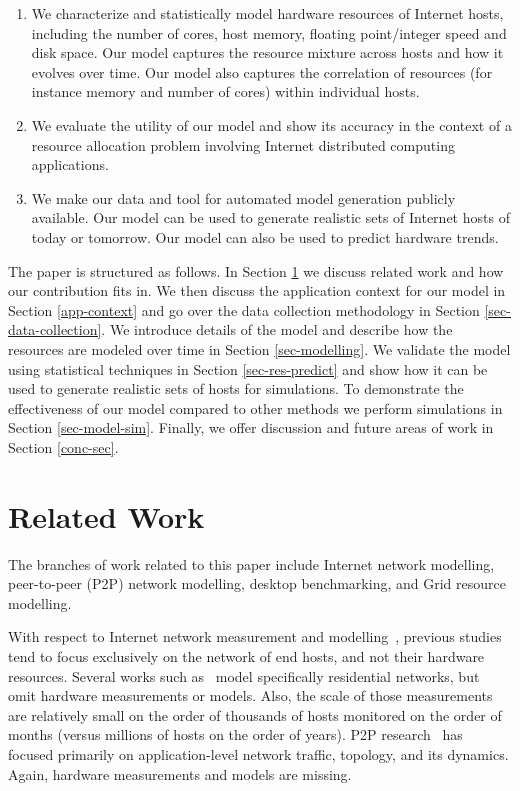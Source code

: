 \documentclass[conference]{IEEEtran}
\begin{document}
\begin{enumerate}
\item We characterize and statistically model hardware
  resources of Internet hosts, including the number of
  cores, host memory, floating point/integer speed and disk
  space.  Our model captures the resource mixture across
  hosts and how it evolves over time.  Our model
  also captures the correlation of resources (for instance
  memory and number of cores) within individual hosts.

\item We evaluate the utility of our model and show its
  accuracy in the context of a resource allocation problem
  involving Internet distributed computing applications.


\item We make our data and tool for automated model
  generation publicly available.  Our model can be used to
  generate realistic sets of Internet hosts of today or
  tomorrow.  Our model can also be used to predict hardware
  trends.
\end{enumerate}

The paper is structured as follows.  In Section \ref{rel-work-sec} we discuss related work and how our contribution fits in.  We then discuss the application context for our model in Section \ref{app-context} and go over the data collection methodology in Section \ref{sec-data-collection}. We introduce details of the
model and describe how the resources are
modeled over time in Section \ref{sec-modelling}.
We validate the model using statistical techniques in Section
\ref{sec-res-predict} and show how it can be used to
generate realistic sets of hosts for simulations.  To demonstrate
the effectiveness of our model compared to other methods we
perform simulations in Section \ref{sec-model-sim}.
Finally, we offer discussion and future areas of work in Section \ref{conc-sec}.

\section{Related Work}
\label{rel-work-sec}

The branches of work related to this paper include Internet network modelling,
peer-to-peer (P2P) network modelling, desktop benchmarking,
and Grid resource modelling.

With respect to Internet network measurement and
modelling~\cite{floyd_ccr03, caida, powerlaw_sigcomm99},
previous studies tend to focus exclusively on the network of
end hosts, and not their hardware resources.  Several works
such as~\cite{neti, dimes,broadband_saroiu07} model
specifically residential networks, but omit hardware
measurements or models.  Also, the scale of those
measurements are relatively small on the order of thousands
of hosts monitored on the order of months (versus millions
of hosts on the order of years).  P2P research~\cite{saroiu_mmcn, chu_ITCom}
has focused primarily on application-level network traffic, topology, and its
dynamics.  Again, hardware measurements and models are missing.
\end{document}
